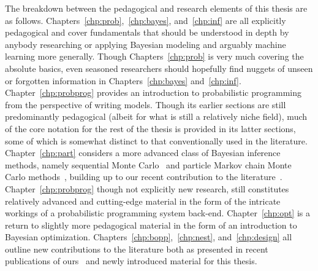 The breakdown between the pedagogical and research elements of this thesis are as follows.
Chapters~\ref{chp:prob},~\ref{chp:bayes}, and~\ref{chp:inf} are all explicitly pedagogical
and cover fundamentals that should be understood in depth by anybody researching or
applying Bayesian modeling and arguably machine learning more generally.  Though
Chapters~\ref{chp:prob} is very much covering the absolute basics,
even seasoned researchers should hopefully find nuggets of unseen or forgotten information 
in Chapters~\ref{chp:bayes} and~\ref{chp:inf}.  Chapter~\ref{chp:probprog} provides an
 introduction to
probabilistic programming from the perspective of writing models.  Though its earlier
sections are still predominantly pedagogical (albeit for what is still a relatively niche field),
much of the core notation for the rest of the thesis is provided in its latter sections, some of
which is somewhat distinct to that conventionally used in the literature.
Chapter~\ref{chp:part} considers a more advanced class of Bayesian inference methods,
namely sequential Monte Carlo~\citep{doucet2009tutorial} and particle Markov chain Monte
Carlo methods~\citep{andrieu2010particle},
building up to our recent contribution to the literature~\citep{rainforth2016interacting}.
Chapter~\ref{chp:probprog} though not explicitly new research, still constitutes
relatively advanced and cutting-edge material in the form of the intricate workings
of a probabilistic programming system back-end.   Chapter~\ref{chp:opt} is a return
to slightly more pedagogical material in the form of an introduction to Bayesian optimization.
Chapters~\ref{chp:bopp},~\ref{chp:nest}, and~\ref{chp:design} all outline new
contributions to the literature both as presented in recent publications of
ours~\citep{rainforth2016nips,rainforth2017pitfalls,vincent2017darc} and newly introduced
material for this thesis.